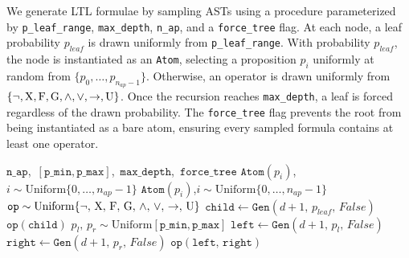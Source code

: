 \documentclass[titlepage,a4paper,11pt]{report}
\begin{document}
    We generate LTL formulae by sampling ASTs using a procedure parameterized by \texttt{p\_leaf\_range}, \texttt{max\_depth}, \texttt{n\_ap}, and a \texttt{force\_tree} flag. At each node, a leaf probability $p_{leaf}$ is drawn uniformly from \texttt{p\_leaf\_range}. With probability $p_{leaf}$, the node is instantiated as an \texttt{Atom}, selecting a proposition $p_i$ uniformly at random from $\{p_0, \ldots, p_{n_{ap}-1}\}$. Otherwise, an operator is drawn uniformly from $\{\neg, \text{X}, \text{F}, \text{G}, \land, \lor, \to, \text{U} \}$. Once the recursion reaches \texttt{max\_depth}, a leaf is forced regardless of the drawn probability. The \texttt{force\_tree} flag prevents the root from being instantiated as a bare atom, ensuring every sampled formula contains at least one operator.

    \begin{algorithm}
        \caption{Recursive formula sampler. The outer call is $\texttt{Gen}(0,\, p_{leaf},\, \texttt{force\_tree})$ with $p_{leaf} \sim \mathrm{Uniform}[\texttt{p\_min}, \texttt{p\_max}]$. Redundant nesting denotes the combinations $\G(\G\,\phi)$, $\F(\F\,\phi)$, and $\neg\neg\phi$.}
        \label{alg:formula_sampling_algorithm}
        \begin{algorithmic}[1]
        \Require $\texttt{n\_ap}$,\ $[\texttt{p\_min}, \texttt{p\_max}]$,\ $\texttt{max\_depth}$,\ $\texttt{force\_tree}$
                \State \Return $\texttt{Atom}(p_i)$,\quad $i \sim \mathrm{Uniform}\{0,\ldots,n_{ap}-1\}$
            \EndIf
                \State \Return $\texttt{Atom}(p_i)$,\quad $i \sim \mathrm{Uniform}\{0,\ldots,n_{ap}-1\}$
            \EndIf
            \State $\texttt{op} \sim \mathrm{Uniform}\{\neg,\, \text{X},\, \text{F},\, \text{G},\, \land,\, \lor,\, \to,\, \text{U}\}$
                \Repeat
                    \State $\texttt{child} \leftarrow \texttt{Gen}(d+1,\, p_{leaf},\, False)$
                \State \Return $\texttt{op}(\texttt{child})$
            \Else
                \State $p_l,\, p_r \sim \mathrm{Uniform}[\texttt{p\_min}, \texttt{p\_max}]$
                \State $\texttt{left} \leftarrow \texttt{Gen}(d+1,\, p_l,\, False)$
                \Repeat
                    \State $\texttt{right} \leftarrow \texttt{Gen}(d+1,\, p_r,\, False)$
                \State \Return $\texttt{op}(\texttt{left},\, \texttt{right})$
            \EndIf
        \EndFunction
        \end{algorithmic}
    \end{algorithm}
\end{document}

